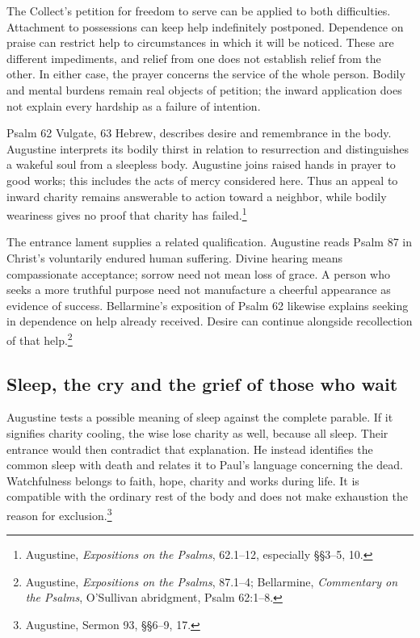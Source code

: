 The Collect's petition for freedom to serve can be applied to both difficulties. Attachment to possessions can keep help indefinitely postponed. Dependence on praise can restrict help to circumstances in which it will be noticed. These are different impediments, and relief from one does not establish relief from the other. In either case, the prayer concerns the service of the whole person. Bodily and mental burdens remain real objects of petition; the inward application does not explain every hardship as a failure of intention.

Psalm 62 Vulgate, 63 Hebrew, describes desire and remembrance in the body. Augustine interprets its bodily thirst in relation to resurrection and distinguishes a wakeful soul from a sleepless body. Augustine joins raised hands in prayer to good works; this includes the acts of mercy considered here. Thus an appeal to inward charity remains answerable to action toward a neighbor, while bodily weariness gives no proof that charity has failed.\footnote{Augustine, \textit{Expositions on the Psalms}, 62.1--12, especially §§3--5, 10.}

The entrance lament supplies a related qualification. Augustine reads Psalm 87 in Christ's voluntarily endured human suffering. Divine hearing means compassionate acceptance; sorrow need not mean loss of grace. A person who seeks a more truthful purpose need not manufacture a cheerful appearance as evidence of success. Bellarmine's exposition of Psalm 62 likewise explains seeking in dependence on help already received. Desire can continue alongside recollection of that help.\footnote{Augustine, \textit{Expositions on the Psalms}, 87.1--4; Bellarmine, \textit{Commentary on the Psalms}, O'Sullivan abridgment, Psalm 62:1--8.}

\subsection{Sleep, the cry and the grief of those who wait}
Augustine tests a possible meaning of sleep against the complete parable. If it signifies charity cooling, the wise lose charity as well, because all sleep. Their entrance would then contradict that explanation. He instead identifies the common sleep with death and relates it to Paul's language concerning the dead. Watchfulness belongs to faith, hope, charity and works during life. It is compatible with the ordinary rest of the body and does not make exhaustion the reason for exclusion.\footnote{Augustine, Sermon 93, §§6--9, 17.}

